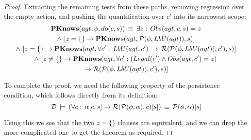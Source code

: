 \begin{proof}
Extracting the remaining tests from these paths, removing regression
over the empty action, and pushing the quantification over $c'$ into
its narrowest scope:\begin{multline*}
\mathbf{PKnows}(agt,\phi,do(c,s))\,\equiv\,\exists z:\, Obs(agt,c,s)=z\\
\wedge\,\left[z=\{\}\rightarrow\mathbf{PKnows}(agt,\mathcal{P}(\phi,LbU(agt)),s)\right]\\
\wedge\,\left[z=\{\}\rightarrow\mathbf{PKnows}(agt,\forall c':\, LbU(agt,c')\,\rightarrow\,\mathcal{R}(\mathcal{P}(\phi,LbU(agt)),c'),s)\right]\\
\wedge\,\left[z\neq\{\}\rightarrow\mathbf{PKnows}(agt,\forall c':\left(Legal(c')\wedge Obs(agt,c')=z\right)\right.\\
\left.\rightarrow\mathcal{R}(\mathcal{P}(\phi,LbU(agt)),c'),s)\right]\end{multline*}


To complete the proof, we need the following property of the persistence
condition, which follows directly from its definition:\[
\mathcal{D}\,\models\,\left(\forall c:\,\alpha[c,s]\rightarrow\mathcal{R}(\mathcal{P}(\phi,\alpha),c)[s]\right)\,\equiv\,\mathcal{P}(\phi,\alpha)[s]\]


Using this we see that the two $z=\{\}$ clauses are equivalent, and
we can drop the more complicated one to get the theorem as required. 
\end{proof}


